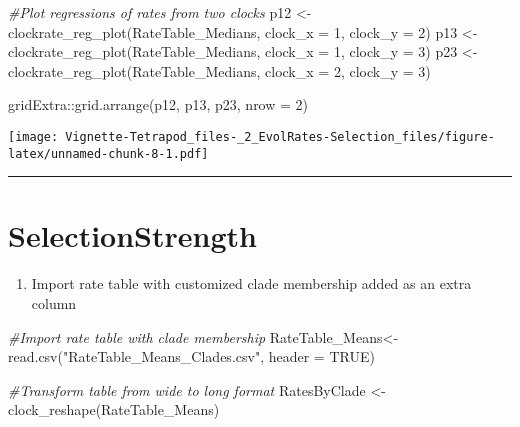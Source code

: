 \documentclass[
]{article}
\newenvironment{Shaded}{\begin{snugshade}}{\end{snugshade}}
\newcommand{\AttributeTok}[1]{\textcolor[rgb]{0.77,0.63,0.00}{#1}}
\newcommand{\CommentTok}[1]{\textcolor[rgb]{0.56,0.35,0.01}{\textit{#1}}}
\newcommand{\ConstantTok}[1]{\textcolor[rgb]{0.00,0.00,0.00}{#1}}
\newcommand{\DecValTok}[1]{\textcolor[rgb]{0.00,0.00,0.81}{#1}}
\newcommand{\FunctionTok}[1]{\textcolor[rgb]{0.00,0.00,0.00}{#1}}
\newcommand{\NormalTok}[1]{#1}
\newcommand{\OtherTok}[1]{\textcolor[rgb]{0.56,0.35,0.01}{#1}}
\newcommand{\SpecialCharTok}[1]{\textcolor[rgb]{0.00,0.00,0.00}{#1}}
\newcommand{\StringTok}[1]{\textcolor[rgb]{0.31,0.60,0.02}{#1}}
\providecommand{\tightlist}{%
  \setlength{\itemsep}{0pt}\setlength{\parskip}{0pt}}
\begin{document}
\begin{Shaded}
\begin{Highlighting}[]
\CommentTok{\#Plot regressions of rates from two clocks}
\NormalTok{p12 }\OtherTok{\textless{}{-}} \FunctionTok{clockrate\_reg\_plot}\NormalTok{(RateTable\_Medians, }\AttributeTok{clock\_x =} \DecValTok{1}\NormalTok{, }\AttributeTok{clock\_y =} \DecValTok{2}\NormalTok{)}
\NormalTok{p13 }\OtherTok{\textless{}{-}} \FunctionTok{clockrate\_reg\_plot}\NormalTok{(RateTable\_Medians, }\AttributeTok{clock\_x =} \DecValTok{1}\NormalTok{, }\AttributeTok{clock\_y =} \DecValTok{3}\NormalTok{)}
\NormalTok{p23 }\OtherTok{\textless{}{-}} \FunctionTok{clockrate\_reg\_plot}\NormalTok{(RateTable\_Medians, }\AttributeTok{clock\_x =} \DecValTok{2}\NormalTok{, }\AttributeTok{clock\_y =} \DecValTok{3}\NormalTok{)}

\NormalTok{gridExtra}\SpecialCharTok{::}\FunctionTok{grid.arrange}\NormalTok{(p12, p13, p23, }\AttributeTok{nrow =} \DecValTok{2}\NormalTok{)}
\end{Highlighting}
\end{Shaded}

\texttt{[image: Vignette-Tetrapod\_files-\_2\_EvolRates-Selection\_files/figure-latex/unnamed-chunk-8-1.pdf]}

\begin{center}\rule{0.5\linewidth}{0.5pt}\end{center}

\hypertarget{selectionstrength}{%
\section{SelectionStrength}\label{selectionstrength}}

\begin{enumerate}
\def\labelenumi{\arabic{enumi}.}
\tightlist
\item
  Import rate table with customized clade membership added as an extra
  column
\end{enumerate}

\begin{Shaded}
\begin{Highlighting}[]
\CommentTok{\#Import rate table with clade membership }
\NormalTok{RateTable\_Means}\OtherTok{\textless{}{-}} \FunctionTok{read.csv}\NormalTok{(}\StringTok{"RateTable\_Means\_Clades.csv"}\NormalTok{, }\AttributeTok{header =} \ConstantTok{TRUE}\NormalTok{)}

\CommentTok{\#Transform table from wide to long format}
\NormalTok{RatesByClade }\OtherTok{\textless{}{-}} \FunctionTok{clock\_reshape}\NormalTok{(RateTable\_Means)}
\end{Highlighting}
\end{Shaded}
\end{document}
